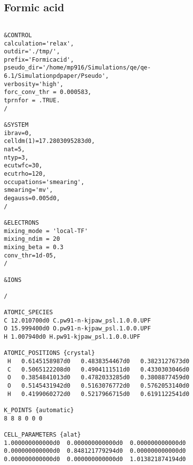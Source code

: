 \subsection{Formic acid}
\begin{verbatim}
    
&CONTROL
calculation='relax',
outdir='./tmp/',
prefix='Formicacid',
pseudo_dir='/home/mp916/Simulations/qe/qe-6.1/Simulationpdpaper/Pseudo',
verbosity='high',
forc_conv_thr = 0.000583,
tprnfor = .TRUE.
/

&SYSTEM
ibrav=0,
celldm(1)=17.2803095283d0,
nat=5,
ntyp=3,
ecutwfc=30,
ecutrho=120,
occupations='smearing',
smearing='mv',
degauss=0.005d0,
/

&ELECTRONS
mixing_mode = 'local-TF'
mixing_ndim = 20
mixing_beta = 0.3
conv_thr=1d-05,
/

&IONS

/

ATOMIC_SPECIES
C 12.010700d0 C.pw91-n-kjpaw_psl.1.0.0.UPF
O 15.999400d0 O.pw91-n-kjpaw_psl.1.0.0.UPF
H 1.007940d0 H.pw91-kjpaw_psl.1.0.0.UPF

ATOMIC_POSITIONS {crystal}
 H   0.6145158987d0   0.4838354467d0   0.3823127673d0
 C   0.5065122208d0   0.4904111511d0   0.4330303046d0
 O   0.3854841013d0   0.4782033285d0   0.3808877459d0
 O   0.5145431942d0   0.5163076772d0   0.5762053140d0
 H   0.4199060272d0   0.5217966715d0   0.6191122541d0

K_POINTS {automatic}
8 8 8 0 0 0

CELL_PARAMETERS {alat}
1.000000000000d0  0.000000000000d0  0.000000000000d0
0.000000000000d0  0.848121779294d0  0.000000000000d0
0.000000000000d0  0.000000000000d0  1.013821874194d0


\end{verbatim}


